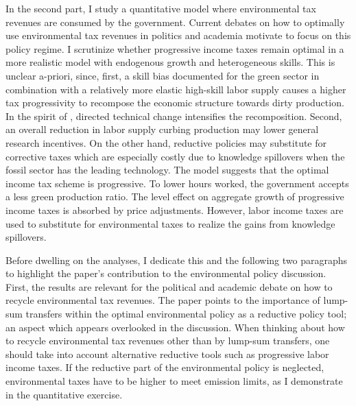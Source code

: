 In the second part, I study a quantitative model where environmental tax revenues are consumed by the government. Current debates on how to optimally use environmental tax revenues in politics \citep{Baker2017TheDividends} and academia \citep[e.g.][]{Fried2018TheGenerations, Carattini2018} motivate to focus on this policy regime. I scrutinize whether progressive income taxes remain optimal in a more realistic model with endogenous growth and heterogeneous skills. This is unclear a-priori, since, first, a skill bias documented for the green sector \citep{Consoli2016DoCapital} in combination with a relatively more elastic high-skill labor supply causes a higher tax progressivity to recompose the economic structure towards dirty production. In the spirit of \cite{Acemoglu2002DirectedChange}, directed technical change intensifies the recomposition. Second, an overall reduction in labor supply curbing production may lower general research incentives.
On the other hand, reductive policies may substitute for corrective taxes  which are especially costly due to knowledge spillovers when the fossil sector has the leading technology. %
 The model suggests that the optimal income tax scheme is progressive. To lower hours worked, the government accepts a less green production ratio.
The level effect on aggregate growth of progressive income taxes is absorbed by price adjustments.
However, labor income taxes are used to substitute for environmental taxes to realize the gains from knowledge spillovers. 
 

Before dwelling on the analyses, I dedicate this and the following two paragraphs to highlight the paper's contribution to the environmental policy discussion. 
First, the results are relevant for the political and academic debate on how  to recycle environmental tax revenues. The paper points to the importance of lump-sum transfers within the optimal environmental policy as a reductive policy tool; an aspect which appears overlooked in the discussion.%
When thinking about how to recycle environmental tax revenues other than by lump-sum transfers,  one should take into account alternative reductive tools such as progressive labor income taxes. 
If the reductive part of the environmental policy is neglected, environmental taxes have to be higher to meet emission limits, as I demonstrate in the quantitative exercise.

